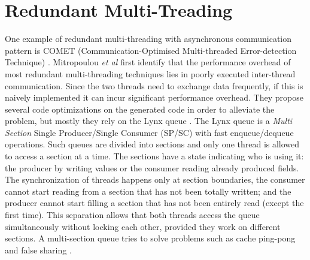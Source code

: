 

\section{Redundant Multi-Treading}
\label{sec:RedundantMultiTreading}

One example of redundant multi-threading with asynchronous communication pattern is COMET (Communication-Optimised Multi-threaded Error-detection Technique) \cite{mitropoulou2016comet}. Mitropoulou \textit{et al} first identify that the performance overhead of most redundant multi-threading techniques lies in poorly executed inter-thread communication. Since the two threads need to exchange data frequently, if this is naively implemented it can incur significant performance overhead. They propose several code optimizations on the generated code in order to alleviate the problem, but mostly they rely on the Lynx queue \cite{mitropoulou2016lynx}. The Lynx queue is a \textit{Multi Section} Single Producer/Single Consumer (SP/SC) with fast enqueue/dequeue operations. Such queues are divided into sections and only one thread is allowed to access a section at a time. The sections have a state indicating who is using it: the producer by writing values or the consumer reading already produced fields. The synchronization of threads happens only at section boundaries, the consumer cannot start reading from a section that has not been totally written; and the producer cannot start filling a section that has not been entirely read (except the first time). This separation allows that both threads access the queue simultaneously without locking each other, provided they work on different sections. A multi-section queue tries to solve problems such as cache ping-pong and false sharing \cite{mitropoulou2016lynx}.

